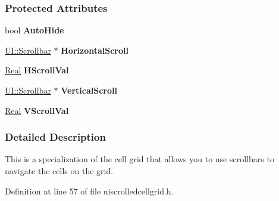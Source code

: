 \subsubsection*{Protected Attributes}
\begin{DoxyCompactItemize}
\item 
\hypertarget{classMezzanine_1_1UI_1_1ScrolledCellGrid_adb9977eeb8511822d502607b37a73fcc}{
bool {\bfseries AutoHide}}
\label{classMezzanine_1_1UI_1_1ScrolledCellGrid_adb9977eeb8511822d502607b37a73fcc}

\item 
\hypertarget{classMezzanine_1_1UI_1_1ScrolledCellGrid_af02c67d396bbb21f25e9ea4b740a41a9}{
\hyperlink{classMezzanine_1_1UI_1_1Scrollbar}{UI::Scrollbar} $\ast$ {\bfseries HorizontalScroll}}
\label{classMezzanine_1_1UI_1_1ScrolledCellGrid_af02c67d396bbb21f25e9ea4b740a41a9}

\item 
\hypertarget{classMezzanine_1_1UI_1_1ScrolledCellGrid_aa845ccfa75b6e697a3d64f604283fdb0}{
\hyperlink{namespaceMezzanine_a726731b1a7df72bf3583e4a97282c6f6}{Real} {\bfseries HScrollVal}}
\label{classMezzanine_1_1UI_1_1ScrolledCellGrid_aa845ccfa75b6e697a3d64f604283fdb0}

\item 
\hypertarget{classMezzanine_1_1UI_1_1ScrolledCellGrid_a753cec141bb5ac1b21d29107e1aedd09}{
\hyperlink{classMezzanine_1_1UI_1_1Scrollbar}{UI::Scrollbar} $\ast$ {\bfseries VerticalScroll}}
\label{classMezzanine_1_1UI_1_1ScrolledCellGrid_a753cec141bb5ac1b21d29107e1aedd09}

\item 
\hypertarget{classMezzanine_1_1UI_1_1ScrolledCellGrid_afa324bb6b7cceebab36f4a447ef7b1cc}{
\hyperlink{namespaceMezzanine_a726731b1a7df72bf3583e4a97282c6f6}{Real} {\bfseries VScrollVal}}
\label{classMezzanine_1_1UI_1_1ScrolledCellGrid_afa324bb6b7cceebab36f4a447ef7b1cc}

\end{DoxyCompactItemize}


\subsubsection{Detailed Description}
This is a specialization of the cell grid that allows you to use scrollbars to navigate the cells on the grid. 

Definition at line 57 of file uiscrolledcellgrid.h.



